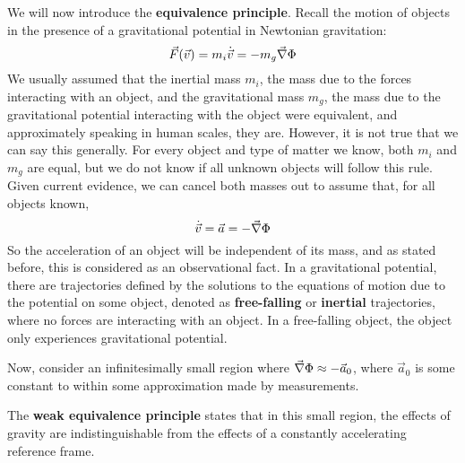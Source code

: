 \documentclass{article}
\begin{document}
 		We will now introduce the \textbf{equivalence principle}. Recall the motion of objects in the presence of a gravitational potential in Newtonian gravitation:
 		$$ \vec{F}(\vec{v}) = m_i \dot{\vec{v}} = - m_g \vec{\nabla}\Phi$$
 		We usually assumed that the inertial mass $m_i$, the mass due to the forces interacting with an object, and the gravitational mass $m_g$, the mass due to the gravitational potential interacting with the object were equivalent, and approximately speaking in human scales, they are. However, it is not true that we can say this generally. For every object and type of matter we know, both $m_i$ and $m_g$ are equal, but we do not know if all unknown objects will follow this rule. Given current evidence, we can cancel both masses out to assume that, for all objects known,
 		$$ \dot{\vec{v}} = \vec{a} = - \vec{\nabla} \Phi$$
 		So the acceleration of an object will be independent of its mass, and as stated before, this is considered as an observational fact. In a gravitational potential, there are trajectories defined by the solutions to the equations of motion due to the potential on some object, denoted as \textbf{free-falling} or \textbf{inertial} trajectories, where no forces are interacting with an object. In a free-falling object, the object only experiences gravitational potential.
 		
 		Now, consider an infinitesimally small region where $\vec{\nabla}\Phi \approx -\vec{a}_0$, where $\vec{a}_0$ is some constant to within some approximation made by measurements. 
 		
 		\begin{defn}
 			The \textbf{weak equivalence principle} states that in this small region, the effects of gravity are indistinguishable from the effects of a constantly accelerating reference frame.
 		\end{defn}
\end{document}
